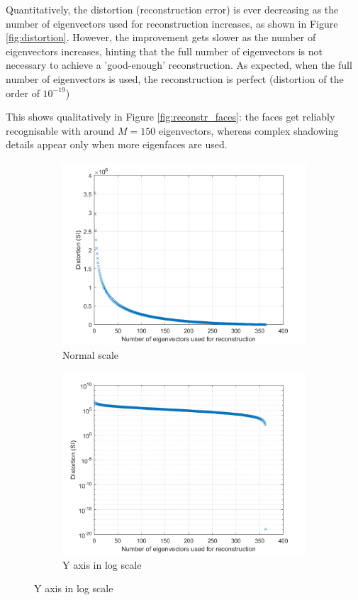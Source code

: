 \documentclass[10pt,technote]{IEEEtran}
\begin{document}
Quantitatively, the distortion (reconstruction error) is ever decreasing as the number of eigenvectors used for reconstruction increases, as shown in Figure \ref{fig:distortion}. However, the improvement gets slower as the number of eigenvectors increases, hinting that the full number of eigenvectors is not necessary to achieve a 'good-enough' reconstruction. As expected, when the full number of eigenvectors is used, the reconstruction is perfect (distortion of the order of $10^{-19}$)

This shows qualitatively in Figure \ref{fig:reconstr_faces}: the faces get reliably recognisable with around $M =150$ eigenvectors, whereas complex shadowing details appear only when more eigenfaces are used.
\begin{figure}[htb!]
    \centering
    \begin{subfigure}[b]{\linewidth}
        \includegraphics[width=\textwidth]{../results/ex1aa/dist_plot.png}
        \caption{Normal scale}
        
        \quad
    \end{subfigure}
    \begin{subfigure}[b]{\linewidth}
        \includegraphics[width=\textwidth]{../results/ex1aa/dist_logplot.png}
        \caption{Y axis in log scale}
        

\end{subfigure}
\end{figure}
\end{document}
